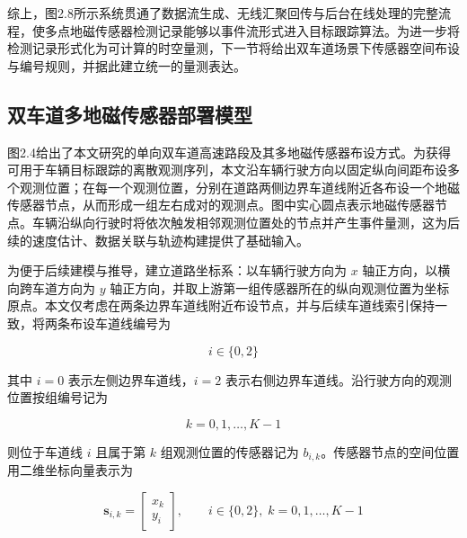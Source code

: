 \documentclass{xdupgthesis}
\begin{document}

综上，图2.8所示系统贯通了数据流生成、无线汇聚回传与后台在线处理的完整流程，使多点地磁传感器检测记录能够以事件流形式进入目标跟踪算法。为进一步将检测记录形式化为可计算的时空量测，下一节将给出双车道场景下传感器空间布设与编号规则，并据此建立统一的量测表达。


\subsection{双车道多地磁传感器部署模型}\label{sec:ch2_summary}

图2.4给出了本文研究的单向双车道高速路段及其多地磁传感器布设方式。为获得可用于车辆目标跟踪的离散观测序列，本文沿车辆行驶方向以固定纵向间距布设多个观测位置；在每一个观测位置，分别在道路两侧边界车道线附近各布设一个地磁传感器节点，从而形成一组左右成对的观测点。图中实心圆点表示地磁传感器节点。车辆沿纵向行驶时将依次触发相邻观测位置处的节点并产生事件量测，这为后续的速度估计、数据关联与轨迹构建提供了基础输入。


为便于后续建模与推导，建立道路坐标系：以车辆行驶方向为 $x$ 轴正方向，以横向跨车道方向为 $y$ 轴正方向，并取上游第一组传感器所在的纵向观测位置为坐标原点。本文仅考虑在两条边界车道线附近布设节点，并与后续车道线索引保持一致，将两条布设车道线编号为

\begin{equation}
	i \in \{0,2\}
	\tag{2-2}
\end{equation}

其中 $i=0$ 表示左侧边界车道线，$i=2$ 表示右侧边界车道线。沿行驶方向的观测位置按组编号记为

\begin{equation}
	k = 0,1,\ldots,K-1
	\tag{2-3}
\end{equation}

则位于车道线 $i$ 且属于第 $k$ 组观测位置的传感器记为 $b_{i,k}$。传感器节点的空间位置用二维坐标向量表示为

\begin{equation}
	\mathbf{s}_{i,k} =
	\begin{bmatrix}
		x_k \\
		y_i
	\end{bmatrix},
	\qquad
	i\in\{0,2\},\; k=0,1,\ldots,K-1
	\tag{2-4}
\end{equation}
\end{document}
